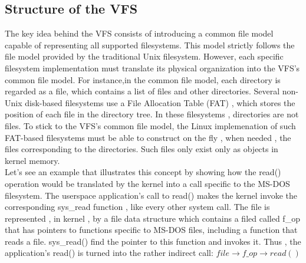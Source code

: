 \documentclass[conference]{IEEEtran}
\begin{document}
\subsection{Structure of the VFS}
The key idea behind the VFS consists of introducing a common file model capable of representing all supported 
filesystems. This model strictly follows the file model provided by the traditional Unix filesystem. However, each specific 
filesystem implementation must translate its physical organization into the VFS's common file model. For instance,in the 
common file model, each directory is regarded as a file, which contains a list of files and other directories. Several 
non-Unix disk-based filesystems use a File Allocation Table (FAT) , which stores the position of each file in the 
directory tree. In these filesystems , directories are not files. To stick to the VFS's common file model, the Linux
implemenation of such FAT-based filesystems must be able to construct on the fly , when needed , the files corresponding
to the directories. Such files only exist only as objects in kernel memory.\\

Let's see an example that illustrates this concept by showing how the read() operation would be translated by the kernel
into a call specific to the MS-DOS filesystem. The userspace application's call to read() makes the kernel invoke the  
corresponding sys\_read function , like every other system call. The file is represented , in kernel , by a file data
structure which contains a filed called f\_op that has pointers to functions specific to MS-DOS files, including a function
that reads a file. sys\_read() find the pointer to this function and invokes it. Thus , the application's read() is turned
into the rather indirect call:  \begin{math} file{\rightarrow}f\_op{\rightarrow}read() \end{math} \\
\end{document}
